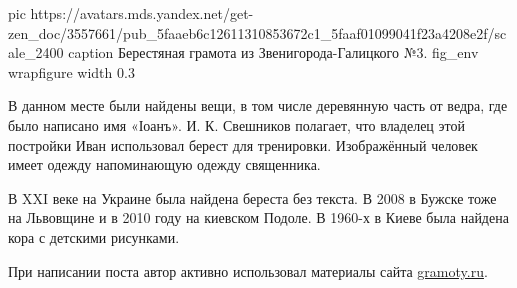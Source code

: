 \ifcmt
  pic https://avatars.mds.yandex.net/get-zen_doc/3557661/pub_5faaeb6c12611310853672c1_5faaf01099041f23a4208e2f/scale_2400
  caption Берестяная грамота из Звенигорода-Галицкого №3.
	fig_env wrapfigure
	width 0.3
\fi

В данном месте были найдены вещи, в том числе деревянную часть от ведра, где
было написано имя «Іоанъ». И. К. Свешников полагает, что владелец этой
постройки Иван использовал берест для тренировки. Изображённый человек имеет
одежду напоминающую одежду священника.

В XXI веке на Украине была найдена береста без текста. В 2008 в Бужске тоже на
Львовщине и в 2010 году на киевском Подоле. В 1960-х в Киеве была найдена кора
с детскими рисунками.

При написании поста автор активно использовал материалы сайта \url{gramoty.ru}.
